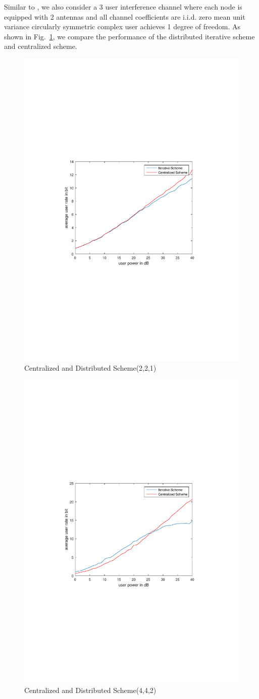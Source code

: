 \documentclass[12pt, onecolumn]{IEEEtran}
\begin{document}
Similar to \cite{gomadam2011distributed}, we also consider a 3 user interference channel where each node is equipped with 2 antennas and all channel coefficients are i.i.d. zero mean unit variance circularly symmetric complex user achieves 1 degree of freedom. As shown in Fig.~\ref{FIG:result_22},  we compare the performance of the  distributed iterative scheme and centralized scheme.
\begin{figure}[H]
    \centering\includegraphics[width=0.65\columnwidth]{result_22.pdf}
    \caption{ Centralized and Distributed Scheme(2,2,1)}\label{FIG:result_22}
\end{figure}
\begin{figure}[H]
    \centering\includegraphics[width=0.65\columnwidth]{result_44.pdf}
    \caption{ Centralized and Distributed Scheme(4,4,2)}\label{FIG:result_44}
\end{figure}
\end{document}
